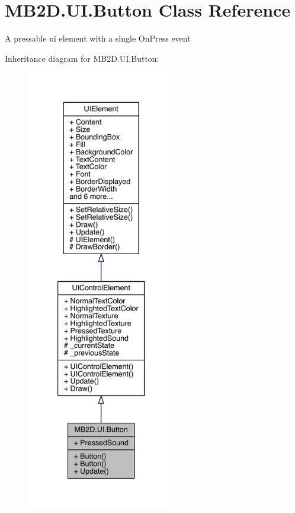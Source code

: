 \hypertarget{class_m_b2_d_1_1_u_i_1_1_button}{}\section{M\+B2\+D.\+U\+I.\+Button Class Reference}
\label{class_m_b2_d_1_1_u_i_1_1_button}


A pressable ui element with a single On\+Press event  




Inheritance diagram for M\+B2\+D.\+U\+I.\+Button\+:\nopagebreak
\begin{figure}[H]
\begin{center}
\leavevmode
\includegraphics[height=550pt]{class_m_b2_d_1_1_u_i_1_1_button__inherit__graph}
\end{center}
\end{figure}


